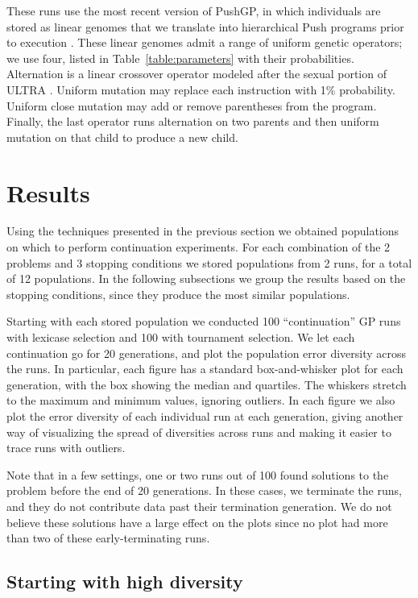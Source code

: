 \documentclass{sig-alternate-05-2015}
\begin{document}
These runs use the most recent version of PushGP, in which individuals are stored as linear genomes that we translate into hierarchical Push programs prior to execution \cite{Helmuth:2015:dissertation}. These linear genomes admit a range of uniform genetic operators; we use four, listed in Table~\ref{table:parameters} with their probabilities. Alternation is a linear crossover operator modeled after the sexual portion of ULTRA \cite{Spector:2013:GPTP}. Uniform mutation may replace each instruction with 1\% probability. Uniform close mutation may add or remove parentheses from the program. Finally, the last operator runs alternation on two parents and then uniform mutation on that child to produce a new child.


\section{Results}
\label{sec:results}

Using the techniques presented in the previous section we obtained populations on which to perform continuation experiments. For each combination of the 2 problems and 3 stopping conditions we stored populations from 2 runs, for a total of 12 populations. In the following subsections we group the results based on the stopping conditions, since they produce the most similar populations.

Starting with each stored population we conducted 100 ``continuation'' GP runs with lexicase selection and 100 with tournament selection. We let each continuation go for 20 generations, and plot the population error diversity across the runs. In particular, each figure has a standard box-and-whisker plot for each generation, with the box showing the median and quartiles. The whiskers stretch to the maximum and minimum values, ignoring outliers. In each figure we also plot the error diversity of each individual run at each generation, giving another way of visualizing the spread of diversities across runs and making it easier to trace runs with outliers.

Note that in a few settings, one or two runs out of 100 found solutions to the problem before the end of 20 generations. In these cases, we terminate the runs, and they do not contribute data past their termination generation. We do not believe these solutions have a large effect on the plots since no plot had more than two of these early-terminating runs.



\subsection{Starting with high diversity}
\label{sec:highDiversityResults}
\end{document}
